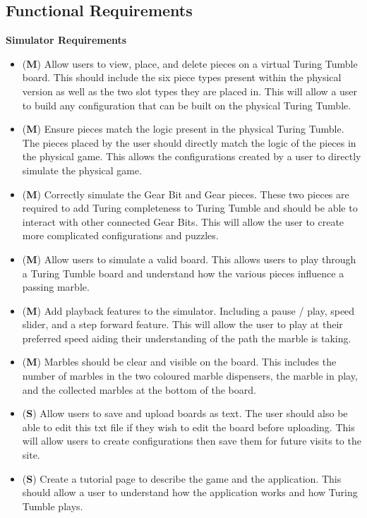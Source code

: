 \documentclass{l4proj}
\begin{document}
\subsection{Functional Requirements}
\textbf{Simulator Requirements}
\begin{itemize}
    \item (\textbf{M}) Allow users to view, place, and delete pieces on a virtual Turing Tumble board. This should include the six piece types present within the physical version as well as the two slot types they are placed in. This will allow a user to build any configuration that can be built on the physical Turing Tumble.
    \item (\textbf{M}) Ensure pieces match the logic present in the physical Turing Tumble. The pieces placed by the user should directly match the logic of the pieces in the physical game. This allows the configurations created by a user to directly simulate the physical game.
    \item (\textbf{M}) Correctly simulate the Gear Bit and Gear pieces. These two pieces are required to add Turing completeness to Turing Tumble and should be able to interact with other connected Gear Bits. This will allow the user to create more complicated configurations and puzzles.
    \item (\textbf{M}) Allow users to simulate a valid board. This allows users to play through a Turing Tumble board and understand how the various pieces influence a passing marble.
    \item (\textbf{M}) Add playback features to the simulator. Including a pause / play, speed slider, and a step forward feature. This will allow the user to play at their preferred speed aiding their understanding of the path the marble is taking.
    \item (\textbf{M}) Marbles should be clear and visible on the board. This includes the number of marbles in the two coloured marble dispensers, the marble in play, and the collected marbles at the bottom of the board.
    \item (\textbf{S}) Allow users to save and upload boards as text. The user should also be able to edit this txt file if they wish to edit the board before uploading. This will allow users to create configurations then save them for future visits to the site.
    \item (\textbf{S}) Create a tutorial page to describe the game and the application. This should allow a user to understand how the application works and how Turing Tumble plays.

\end{itemize}
\end{document}
